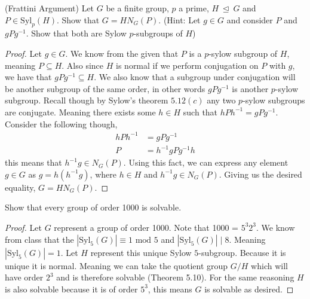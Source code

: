 \documentclass[11pt]{article}
\newenvironment{problem}[2][Problem\!]{\begin{trivlist}
\item[\hskip \labelsep {\bfseries #1}\hskip \labelsep {\bfseries #2}]}{\end{trivlist}}
\newcommand{\nmeq}{{\ \unlhd\ }}
\newcommand{\ord}[1]{{\left|#1\right|}}
\begin{document}
\begin{tcolorbox}
    \begin{problem} {5.5} 
        (Frattini Argument) Let $G$ be a finite group, $p$ a prime, $H \nmeq G$ and $P \in \text{Syl}_p(H)$. Show that $G=HN_G(P)$. (Hint: Let $g\in G$ and consider $P$ and $gPg^{-1}$. Show that both are Sylow $p$-subgroups of $H$)
    \end{problem}
\end{tcolorbox}
\begin{proof}
  Let $g\in G$. We know from the given that $P$ is a $p$-sylow subgroup of $H$, meaning $P \subseteq H$. Also since $H$ is normal if we perform conjugation on $P$ with $g$, we have that $gPg^{-1}\subseteq H$. We also know that a subgroup under conjugation will be another subgroup of the same order, in other words $gPg^{-1}$ is another $p$-sylow subgroup. Recall though by Sylow's theorem $5.12(c)$ any two $p$-sylow subgroups are conjugate. Meaning there exists some $h\in H$ such that $hPh^{-1} = gPg^{-1}$. Consider the following though,
  \begin{align*}
    hPh^{-1} &= gPg^{-1} \\
    P &= h^{-1}gPg^{-1}h 
  \end{align*} 
  this means that $h^{-1}g\in N_G(P)$. Using this fact, we can express any element $g\in G$ as $g = h(h^{-1}g)$, where $h\in H$ and $h^{-1}g \in N_G(P)$. Giving us the desired equality, $G = HN_G(P)$.
\end{proof}

\begin{tcolorbox}
  \begin{problem} {5.6}
    Show that every group of order 1000 is solvable. 
  \end{problem}
\end{tcolorbox}
\begin{proof}
  Let $G$ represent a group of order 1000. Note that 1000 = $5^{3}2^{3}$. We know from class that the $\ord{\text{Syl}_5(G)} \equiv 1 \text{ mod 5}$ and $\ord{\text{Syl}_5(G)}\mid 8$. Meaning $\ord{\text{Syl}_5(G)} = 1$. Let $H$ represent this unique Sylow $5$-subgroup. Because it is unique it is normal. Meaning we can take the quotient group $G/H$ which will have order $2^{3}$ and is therefore solvable (Theorem 5.10). For the same reasoning $H$ is also solvable because it is of order $5^{3}$, this means $G$ is solvable as desired.
\end{proof}
\end{document}
